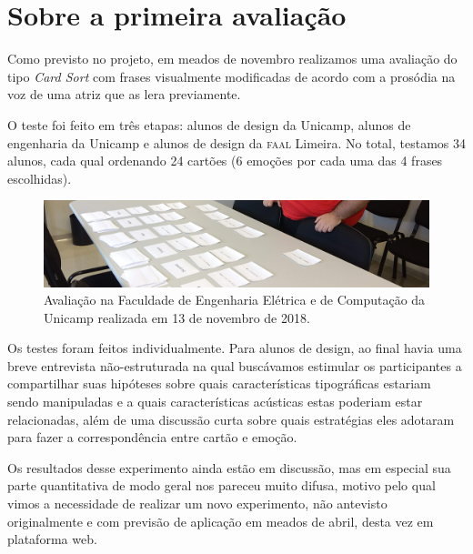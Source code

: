\documentclass[a4paper,11pt,titlepage,singlespacing]{article}
\begin{document}
{\color{pos_parecer}

    \section{Sobre a primeira avaliação}

    Como previsto no projeto, em meados de novembro realizamos uma avaliação do tipo \textit{Card Sort} com frases visualmente modificadas de acordo com a prosódia na voz de uma atriz que as lera previamente. 
    
    O teste foi feito em três etapas: alunos de design da Unicamp, alunos de engenharia da Unicamp e alunos de design da \textsc{faal} Limeira. No total, testamos 34 alunos, cada qual ordenando 24 cartões (6 emoções por cada uma das 4 frases escolhidas).
    
    
    \begin{figure}[!ht]    
        \centering
        \label{fig:card_sort}
        \captionsetup{width=\textwidth}
            \includegraphics[width=1\textwidth]{fig/card_sort.jpg}
            
        \caption{Avaliação na Faculdade de Engenharia Elétrica e de Computação da Unicamp realizada em 13 de novembro de 2018.}
    \end{figure}
    

    
    Os testes foram feitos individualmente. Para alunos de design, ao final havia uma breve entrevista não-estruturada na qual buscávamos estimular os participantes a compartilhar suas hipóteses sobre quais características tipográficas estariam sendo manipuladas e a quais características acústicas estas poderiam estar relacionadas, além de uma discussão curta sobre quais estratégias eles adotaram para fazer a correspondência entre cartão e emoção.
    
    Os resultados desse experimento ainda estão em discussão, mas em especial sua parte quantitativa de modo geral nos pareceu muito difusa, motivo pelo qual vimos a necessidade de realizar um novo experimento, não antevisto originalmente e com previsão de aplicação em meados de abril, desta vez em plataforma web. 
    
}
\end{document}
